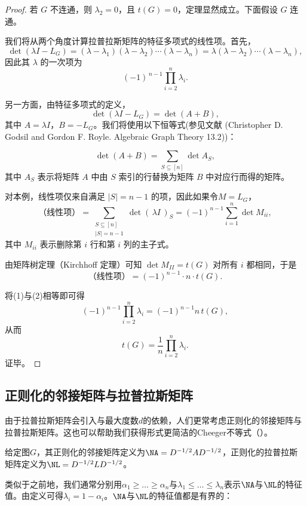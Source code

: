 \documentclass[lang=cn,newtx,10pt,scheme=chinese,chinesefont=nofont,citestyle=gb7714-2015, bibstyle=gb7714-2015]{elegantbook}
\begin{document}
\begin{refsection}
\begin{proof}
若 $G$ 不连通，则 $\lambda_2=0$，且 $t(G)=0$，定理显然成立。下面假设 $G$ 连通。

我们将从两个角度计算拉普拉斯矩阵的特征多项式的线性项。首先，
\[
\det(\lambda I - L_G)
=(\lambda-\lambda_1)(\lambda-\lambda_2)\cdots(\lambda-\lambda_n)
=\lambda(\lambda-\lambda_2)\cdots(\lambda-\lambda_n),
\]
因此其 $\lambda$ 的一次项为
\[
(-1)^{\,n-1}\prod_{i=2}^n \lambda_i.
\tag{1}
\]

另一方面，由特征多项式的定义，
\[
\det(\lambda I - L_G)=\det(A+B),
\]
其中 $A=\lambda I$，$B=-L_G$。我们将使用以下恒等式(参见文献 (Christopher D. Godsil and Gordon F. Royle. Algebraic Graph Theory 13.2))：

\[
\det(A+B)=\sum_{S\subseteq[n]} \det A_S,
\]
其中 $A_S$ 表示将矩阵 $A$ 中由 $S$ 索引的行替换为矩阵 $B$ 中对应行而得的矩阵。

对本例，线性项仅来自满足 $|S|=n-1$ 的项，因此如果令$M=L_G$，
\[
\text{（线性项）}=\sum_{\substack{S\subseteq[n]\\ |S|=n-1}}
\det(\,\lambda I\,)_S
= (-1)^{n-1}\sum_{i=1}^n \det M_{ii},
\]
其中 $M_{ii}$ 表示删除第 $i$ 行和第 $i$ 列的主子式。

由矩阵树定理（Kirchhoff 定理）可知 $\det M_{II}=t(G)$ 对所有 $i$ 都相同，于是
\[
\text{（线性项）}=(-1)^{n-1}\cdot n\cdot t(G).
\tag{2}
\]

将(1)与(2)相等即可得
\[
(-1)^{n-1}\prod_{i=2}^n \lambda_i
=
(-1)^{n-1} n\,t(G),
\]
从而
\[
t(G)=\frac{1}{n}\prod_{i=2}^n \lambda_i.
\]
证毕。
\end{proof}





\subsection{正则化的邻接矩阵与拉普拉斯矩阵}
由于拉普拉斯矩阵会引入与最大度数$d$的依赖，人们更常考虑正则化的邻接矩阵与拉普拉斯矩阵。这也可以帮助我们获得形式更简洁的Cheeger不等式（）。

\begin{definition}[正则化的邻接矩阵与拉普拉斯矩阵]
    给定图$G$，其正则化的邻接矩阵定义为$\NA=D^{-1/2}AD^{-1/2}$，正则化的拉普拉斯矩阵定义为$\NL=D^{-1/2}LD^{-1/2}$。
\end{definition}

类似于之前地，我们通常分别用$\alpha_1\geq\dots\geq\alpha_n$与$\lambda_1\leq\dots\leq\lambda_n$表示$\NA$与$\NL$的特征值。由定义可得$\lambda_i=1-\alpha_i$。$\NA$与$\NL$的特征值都是有界的：


\end{refsection}
\end{document}
